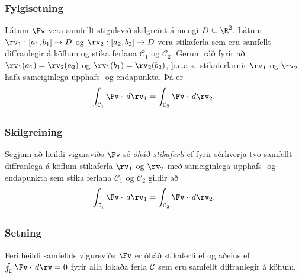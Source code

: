 \subsubsection{Fylgisetning \rtask{}}
Látum $\Fv$ vera samfellt stigulsvið
skilgreint á mengi $D\subseteq \R^2$.   Látum
$\rv_1:[a_1,b_1]\rightarrow D$ og $\rv_2:[a_2,b_2]\rightarrow D$ vera
stikaferla sem eru samfellt diffranlegir á köflum og stika ferlana $\mathcal{C}_1$ og $\mathcal{C}_2$.  Gerum ráð fyrir
að $\rv_1(a_1)=\rv_2(a_2)$ og $\rv_1(b_1)=\rv_2(b_2)$, þ.e.a.s.\ stikaferlarnir $\rv_1$ og $\rv_2$ hafa sameiginlega upphafs- og endapunkta.   Þá er  
$$\int_{{\cal C}_1} \Fv\cdot\,d\rv_1=\int_{{\cal C}_2} \Fv\cdot\,d\rv_2.$$ 
 





\subsection{} 

\subsubsection{Skilgreining \rtask{}}
 Segjum að heildi vigursviðs $\Fv$ sé {\em
  óháð stikaferli} ef fyrir sérhverja tvo samfellt diffranlega á
köflum stikaferla $\rv_1$ og $\rv_2$ með sameiginlega upphafs- og
endapunkta sem stika ferlana $\mathcal{C}_1$ og $\mathcal{C}_2$ gildir að  
$$\int_{{\cal C}_1} \Fv\cdot\,d\rv_1=
\int_{{\cal C}_2} \Fv\cdot\,d\rv_2.$$ 






\subsection{} 

\subsubsection{Setning }
  Ferilheildi samfellds vigursviðs $\Fv$ er óháð
stikaferli ef og aðeins ef $\oint_{\cal C} \Fv\cdot\,d\rv=0$ fyrir alla
lokaða ferla $\cal C$ sem eru samfellt diffranlegir á köflum. 







\subsection{} 
